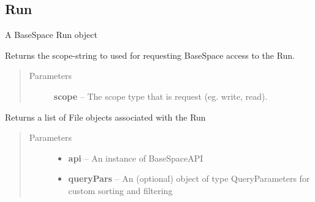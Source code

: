 \documentclass[letterpaper,10pt,english]{sphinxmanual}
\begin{document}
\subsection{Run}
\label{Available modules:run}

\begin{fulllineitems}
\label{Available modules:BaseSpacePy.model.Run.Run}
A BaseSpace Run object

\begin{fulllineitems}
\label{Available modules:BaseSpacePy.model.Run.Run.getAccessStr}
Returns the scope-string to used for requesting BaseSpace access to the Run.
\begin{quote}\begin{description}
\item[{Parameters}] \leavevmode
\textbf{scope} -- The scope type that is request (eg. write, read).

\end{description}\end{quote}

\end{fulllineitems}


\begin{fulllineitems}
\label{Available modules:BaseSpacePy.model.Run.Run.getFiles}
Returns a list of File objects associated with the Run
\begin{quote}\begin{description}
\item[{Parameters}] \leavevmode\begin{itemize}
\item {} 
\textbf{api} -- An instance of BaseSpaceAPI

\item {} 
\textbf{queryPars} -- An (optional) object of type QueryParameters for custom sorting and filtering

\end{itemize}

\end{description}\end{quote}


\end{fulllineitems}
\end{fulllineitems}
\end{document}

